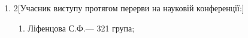 \documentclass[
	a4paper,
	12pt,
	oneside,
	draft
]{extreport}
\begin{document}
\begin{enumerate}[topsep=0pt,itemsep=-1ex,partopsep=0ex,parsep=1ex]
\item 
\begin{multicols}{2}[Учасник виступу протягом перерви на науковій конференції:] 
\begin{enumerate}[topsep=0pt,itemsep=-1ex,partopsep=0ex,parsep=1ex,label=\arabic*.]
\item Ліфенцова С.Ф.\hfill --- 321 група;
\end{enumerate}
\end{multicols}

\end{enumerate}
\end{document}
